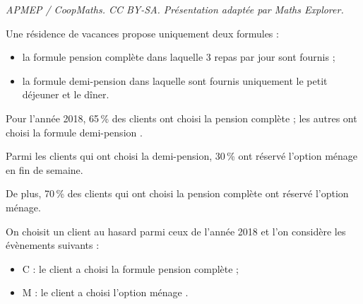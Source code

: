 \documentclass[10pt]{article}
\begin{document}
\noindent\textit{APMEP / CoopMaths. CC BY-SA. Présentation adaptée par Maths Explorer.}\par\medskip
\medskip

Une résidence de vacances propose uniquement deux formules :

\begin{itemize}
\item la formule \og pension complète \fg{} dans laquelle 3 repas par jour sont fournis ;
\item la formule \og demi-pension \fg{} dans laquelle sont fournis uniquement le petit déjeuner et le dîner.
\end{itemize}
Pour l’année 2018, 65\,\% des clients ont choisi la pension complète ; les autres ont choisi la formule \og demi-pension \fg.

Parmi les clients qui ont choisi la demi-pension, 30\,\% ont réservé l’option \og ménage \fg{} en fin de semaine.

De plus, 70\,\% des clients qui ont choisi la pension complète ont réservé l’option \og ménage\fg.

On choisit un client au hasard parmi ceux de l’année 2018 et l’on considère les évènements suivants :

\begin{itemize}
\item C : le client a choisi la formule \og pension complète \fg{} ;
\item M : le client a choisi l’option \og ménage \fg.
\end{itemize}

\medskip
\end{document}
